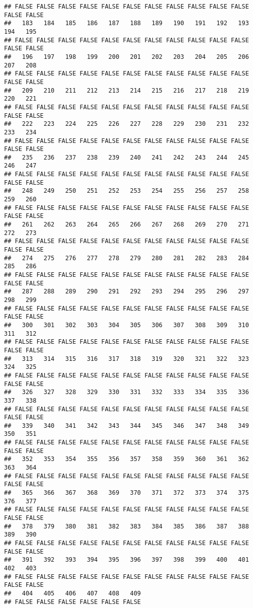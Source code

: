 \documentclass[
]{article}
\begin{document}
\begin{verbatim}
## FALSE FALSE FALSE FALSE FALSE FALSE FALSE FALSE FALSE FALSE FALSE FALSE FALSE 
##   183   184   185   186   187   188   189   190   191   192   193   194   195 
## FALSE FALSE FALSE FALSE FALSE FALSE FALSE FALSE FALSE FALSE FALSE FALSE FALSE 
##   196   197   198   199   200   201   202   203   204   205   206   207   208 
## FALSE FALSE FALSE FALSE FALSE FALSE FALSE FALSE FALSE FALSE FALSE FALSE FALSE 
##   209   210   211   212   213   214   215   216   217   218   219   220   221 
## FALSE FALSE FALSE FALSE FALSE FALSE FALSE FALSE FALSE FALSE FALSE FALSE FALSE 
##   222   223   224   225   226   227   228   229   230   231   232   233   234 
## FALSE FALSE FALSE FALSE FALSE FALSE FALSE FALSE FALSE FALSE FALSE FALSE FALSE 
##   235   236   237   238   239   240   241   242   243   244   245   246   247 
## FALSE FALSE FALSE FALSE FALSE FALSE FALSE FALSE FALSE FALSE FALSE FALSE FALSE 
##   248   249   250   251   252   253   254   255   256   257   258   259   260 
## FALSE FALSE FALSE FALSE FALSE FALSE FALSE FALSE FALSE FALSE FALSE FALSE FALSE 
##   261   262   263   264   265   266   267   268   269   270   271   272   273 
## FALSE FALSE FALSE FALSE FALSE FALSE FALSE FALSE FALSE FALSE FALSE FALSE FALSE 
##   274   275   276   277   278   279   280   281   282   283   284   285   286 
## FALSE FALSE FALSE FALSE FALSE FALSE FALSE FALSE FALSE FALSE FALSE FALSE FALSE 
##   287   288   289   290   291   292   293   294   295   296   297   298   299 
## FALSE FALSE FALSE FALSE FALSE FALSE FALSE FALSE FALSE FALSE FALSE FALSE FALSE 
##   300   301   302   303   304   305   306   307   308   309   310   311   312 
## FALSE FALSE FALSE FALSE FALSE FALSE FALSE FALSE FALSE FALSE FALSE FALSE FALSE 
##   313   314   315   316   317   318   319   320   321   322   323   324   325 
## FALSE FALSE FALSE FALSE FALSE FALSE FALSE FALSE FALSE FALSE FALSE FALSE FALSE 
##   326   327   328   329   330   331   332   333   334   335   336   337   338 
## FALSE FALSE FALSE FALSE FALSE FALSE FALSE FALSE FALSE FALSE FALSE FALSE FALSE 
##   339   340   341   342   343   344   345   346   347   348   349   350   351 
## FALSE FALSE FALSE FALSE FALSE FALSE FALSE FALSE FALSE FALSE FALSE FALSE FALSE 
##   352   353   354   355   356   357   358   359   360   361   362   363   364 
## FALSE FALSE FALSE FALSE FALSE FALSE FALSE FALSE FALSE FALSE FALSE FALSE FALSE 
##   365   366   367   368   369   370   371   372   373   374   375   376   377 
## FALSE FALSE FALSE FALSE FALSE FALSE FALSE FALSE FALSE FALSE FALSE FALSE FALSE 
##   378   379   380   381   382   383   384   385   386   387   388   389   390 
## FALSE FALSE FALSE FALSE FALSE FALSE FALSE FALSE FALSE FALSE FALSE FALSE FALSE 
##   391   392   393   394   395   396   397   398   399   400   401   402   403 
## FALSE FALSE FALSE FALSE FALSE FALSE FALSE FALSE FALSE FALSE FALSE FALSE FALSE 
##   404   405   406   407   408   409 
## FALSE FALSE FALSE FALSE FALSE FALSE
\end{verbatim}
\end{document}
